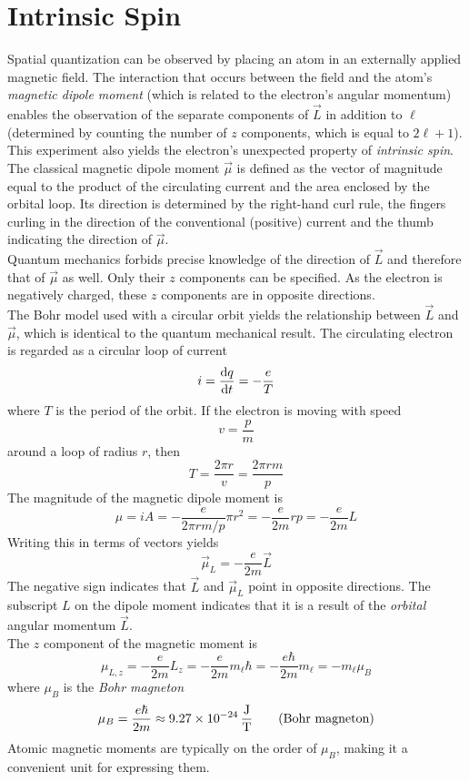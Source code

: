 \documentclass{subfiles}
\begin{document}
	\section{Intrinsic Spin}
		Spatial quantization can be observed by placing an atom in an externally applied magnetic field. The interaction that occurs between the field and the atom's \textit{magnetic dipole moment} (which is related to the electron's angular momentum) enables the observation of the separate components of \(\vec{L}\) in addition to \(\ell\) (determined by counting the number of \(z\) components, which is equal to \(2\ell + 1\)). This experiment also yields the electron's unexpected property of \textit{intrinsic spin}.
			The classical magnetic dipole moment \(\vec{\mu}\) is defined as the vector of magnitude equal to the product of the circulating current and the area enclosed by the orbital loop. Its direction is determined by the right-hand curl rule, the fingers curling in the direction of the conventional (positive) current and the thumb indicating the direction of \(\vec{\mu}\). \\
			Quantum mechanics forbids precise knowledge of the direction of \(\vec{L}\) and therefore that of \(\vec{\mu}\) as well. Only their \(z\) components can be specified. As the electron is negatively charged, these \(z\) components are in opposite directions. \\
			The Bohr model used with a circular orbit yields the relationship between \(\vec{L}\) and \(\vec{\mu}\), which is identical to the quantum mechanical result. The circulating electron is regarded as a circular loop of current
				\[
					i = \dv{q}{t}
						= -\frac{e}{T}
				\]
				where \(T\) is the period of the orbit. If the electron is moving with speed
				\[v = \frac{p}{m}\]
				around a loop of radius \(r\), then
				\[
					T = \frac{2\pi r}{v}
						= \frac{2\pi rm}{p}
				\]
				The magnitude of the magnetic dipole moment is
				\[
					\mu = iA
						= -\frac{e}{2\pi rm/p}\pi r^2
						= -\frac{e}{2m}rp
						= -\frac{e}{2m}L
				\]
				Writing this in terms of vectors yields
				\[\vec{\mu}_L = -\frac{e}{2m}\vec{L}\]
				The negative sign indicates that \(\vec{L}\) and \(\vec{\mu}_L\) point in opposite directions. The subscript \(L\) on the dipole moment indicates that it is a result of the \textit{orbital} angular momentum \(\vec{L}\). \\
				The \(z\) component of the magnetic moment is
				\[
					\mu_{L, z} = -\frac{e}{2m}L_z
						= -\frac{e}{2m}m_\ell\hbar
						= -\frac{e\hbar}{2m}m_\ell
						= -m_\ell\mu_B
				\]
				where \(\mu_B\) is the \textit{Bohr magneton}
				\[
					\mu_B = \frac{e\hbar}{2m} 
						\approx \SI{9.27E-24}{\frac{J}{T}}
						\tag{Bohr magneton}
				\]
				Atomic magnetic moments are typically on the order of \(\mu_B\), making it a convenient unit for expressing them.
\end{document}
